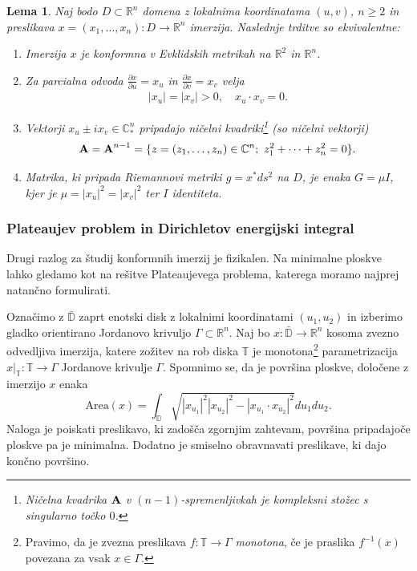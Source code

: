 \documentclass[12pt,a4paper,twoside]{article}
\theoremstyle{definition} %
\theoremstyle{plain} %
\newtheorem{lema}[definicija]{Lema}
\numberwithin{equation}{section}  %
\begin{document}
\begin{lema} \label{lema:konform-ekvivalence}
Naj bodo $D \subset \mathbb{R}^{n}$ domena z lokalnima koordinatama $(u,v)$, $n \geq 2$ in preslikava $x = (x_{1}, \dots , x_{n}) \colon D \to \mathbb{R}^{n}$ imerzija. Naslednje trditve so ekvivalentne:
\begin{enumerate}
	\item Imerzija $x$ je konformna v Evklidskih metrikah na $\mathbb{R}^2$ in $\mathbb{R}^{n}$.
	\item Za parcialna odvoda $\frac{\partial x}{\partial u} = x_{u}$ in $\frac{\partial x}{\partial v} = x_{v}$ velja
		\begin{gather}
		|x_{u}| = |x_{v}| > 0, \quad x_{u} \cdot x_{v} = 0.
		\end{gather}
	\item Vektorji $x_{u} \pm ix_{v} \in \mathbb{C}_{*}^{n}$ pripadajo \emph{ničelni kvadriki}\footnote{Ničelna kvadrika $\textbf{\textup{A}}$ v $(n-1)$-spremenljivkah je kompleksni stožec s singularno točko $0$.} (so \emph{ničelni vektorji})
		\begin{gather}
		\textbf{\textup{A}} = \textbf{\textup{A}}^{n-1} = \{ z=(z_{1}, \dots , z_{n}) \in \mathbb{C}^{n}; \ z_{1}^2 + \cdots + z_{n}^2 = 0 \}.
		\end{gather}
	\item Matrika, ki pripada Riemannovi metriki $g = x^{*}ds^2$ na $D$, je enaka $G = \mu I$, kjer je $\mu = |x_{u}|^2 = |x_{v}|^2$ ter $I$ identiteta.
\end{enumerate}
\end{lema}

\subsubsection{Plateaujev problem in Dirichletov energijski integral}
%
Drugi razlog za študij konformnih imerzij je fizikalen. Na minimalne ploskve lahko gledamo kot na rešitve Plateaujevega problema, katerega moramo najprej natančno formulirati.

Označimo z $\bar{\mathbb{D}}$ zaprt enotski disk z lokalnimi koordinatami $(u_{1}, u_{2})$ in izberimo gladko orientirano Jordanovo krivuljo $\Gamma \subset \mathbb{R}^{n}$.
Naj bo $x \colon \bar{\mathbb{D}} \to \mathbb{R}^{n}$ kosoma zvezno odvedljiva imerzija, katere zožitev na rob diska $\mathbb{T}$ je monotona\footnote{Pravimo, da je zvezna preslikava $f \colon \mathbb{T} \to \Gamma$ \emph{monotona}, če je praslika $f^{-1}(x)$ povezana za vsak $x \in \Gamma$.} parametrizacija $x|_{\mathbb{T}} \colon \mathbb{T} \to \Gamma$ Jordanove krivulje $\Gamma$.
Spomnimo se, da je površina ploskve, določene z imerzijo $x$ enaka
\begin{equation} \label{eq:area}
\text{Area}(x) = \int_{\mathbb{D}} \sqrt{|x_{u_1}|^2 |x_{u_2}|^2 - |x_{u_1} \cdot x_{u_2}|^2} du_{1}du_{2}.
\end{equation}
Naloga je poiskati preslikavo, ki zadošča zgornjim zahtevam, površina pripadajoče ploskve pa je minimalna. Dodatno je smiselno obravnavati preslikave, ki dajo končno površino.
\end{document}
